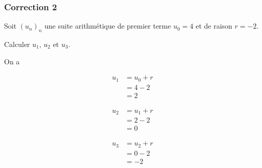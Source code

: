 \documentclass[15pt, mathserif]{beamer}
\begin{document}
\begin{frame}
\vspace{-10mm}
	\frametitle{Correction 2}
Soit $(u_n)_n$ une suite arithmétique de premier terme $u_0=4$ et de raison $r=-2$. 
 
 Calculer $u_1$, $u_2$ et $u_3$. 
 
 On a 
 \begin{minipage}{0.25\textwidth} 
 
 \begin{align*} 
 u_1 &= u_0+r \\ &= 4-2 \\ &=2
 \end{align*} 
  
 \end{minipage} \hfil \begin{minipage}{0.25\textwidth} 
 
 \begin{align*} 
 u_2 &= u_1+r \\ &= 2-2 \\ &=0
 \end{align*} 
 
 \end{minipage} \hfil \begin{minipage}{0.25\textwidth} 
 
 \begin{align*} 
 u_3 &= u_2+r \\ &= 0-2 \\ &=-2
 \end{align*} 
 
 \end{minipage} 
\end{frame}
\end{document}
